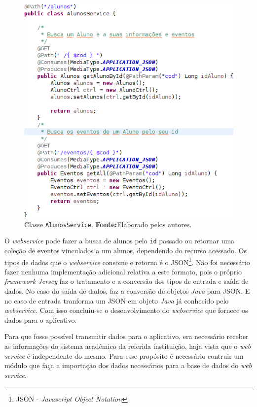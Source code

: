 		\begin{figure}[h!]
			\centerline{\includegraphics[scale=0.7]{./imagens/2_q_metodologico/qm13.png}}
			\caption[Classe \texttt{AlunosService}]{Classe \texttt{AlunosService}.
			\textbf{Fonte:}Elaborado pelos autores.}
			\label{fig:qm13}
		\end{figure}
		
		\par O \textit{webservice} pode fazer a busca de alunos pelo \texttt{id}
passado ou retornar uma coleção de eventos vinculados a um alunos, dependendo
do recurso acessado. Os tipos de dados que o \textit{webservice} consome e
retorna é o JSON\footnote{JSON - \textit{Javascript Object Notation}}. Não foi
necessário fazer nenhuma implementação adicional relativa a este formato, pois
o próprio \textit{framework Jersey} faz o tratamento e a conversão dos tipos de
entrada e saída de dados. No caso do saída de dados, faz a conversão de objetos 
\textit{Java} para JSON. E no caso de entrada tranforma um JSON em objeto
\textit{Java} já conhecido pelo \textit{webservice}. Com isso concluiu-se o
desenvolvimento do \textit{webservice} que fornece os dados para o aplicativo.

	\par Para que fosse possível transmitir dados para o aplicativo, era
necessário receber as informações do sistema acadêmico da referida instituição,
haja vista que o \textit{web service} é independente do mesmo. Para esse
propósito é necessário  contruir um módulo que faça a importação dos dados
necessários para a base de dados do \textit{web service}. 

